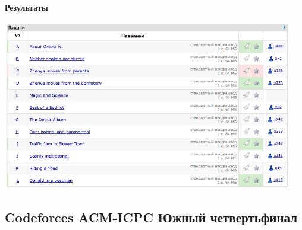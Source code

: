 \documentclass[a4paper,12pt]{article}
\begin{document}
\newpage
\textbf{{\large Результаты}} \\
\begin{center}
\includegraphics[width=0.95\textwidth]{CT_ACM_EAST/CT_ACM_EAST_result.png}\\ [1cm]
\end{center}



%
%
\newpage
\subsection{Codeforces ACM-ICPC Южный четвертьфинал}
\end{document}

